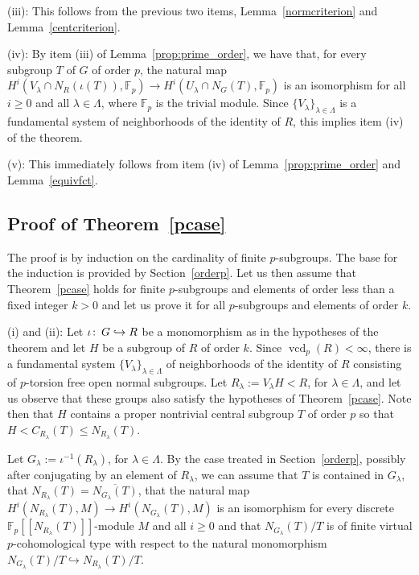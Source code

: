\documentclass[12pt,twoside]{amsart}
\newcommand\F{{\mathbb F}}
\newcommand\hookra{\hookrightarrow}
\newcommand\ol{\overline}
\newcommand\ld{\lambda}
\newcommand\Ld{\Lambda}
\def\co{\colon\thinspace}
\newcommand\vcd{\operatorname{vcd}}
\theoremstyle{definition}
\begin{document}
\noindent
(iii): This follows from the previous two items, Lemma~\ref{normcriterion} and Lemma~\ref{centcriterion}.
\smallskip

\noindent
(iv): By item (iii) of Lemma~\ref{prop:prime_order}, we have that, for every subgroup $T$ of $G$ of order $p$, the natural map
$H^i (V_\ld\cap N_{R}(\iota(T)),\F_p)\to H^i(U_\ld\cap N_G(T),\F_p)$ is an isomorphism for all $i\geq 0$ and all $\ld\in\Ld$,
where $\F_p$ is the trivial module. Since $\{V_\ld\}_{\ld\in\Ld}$ is a fundamental system of neighborhoods of the identity of $R$,
this implies  item (iv) of the theorem. 
\smallskip

\noindent
(v): This immediately follows from item (iv) of Lemma~\ref{prop:prime_order} and Lemma~\ref{equivfct}.
	
	
\subsection{Proof of Theorem~\ref{pcase}}\label{pcaseproof}
The proof is by induction on the cardinality of finite $p$-subgroups. The base for the induction is provided by Section~\ref{orderp}.
Let us then assume that Theorem~\ref{pcase} holds for finite $p$-subgroups and elements of order less than a fixed integer $k>0$ 
and let us prove it for all $p$-subgroups and elements of order $k$. 
\smallskip

\noindent
(i) and (ii):
Let $\iota\co G\hookra R$ be a monomorphism as in the hypotheses of the theorem and let $H$ be a subgroup of $R$ of order $k$. 
Since $\vcd_p(R)<\infty$, there is a fundamental system $\{V_\ld\}_{\ld\in\Ld}$ of neighborhoods of the identity of $R$ consisting of 
$p$-torsion free open normal subgroups. Let $R_\ld:=V_\ld H<R$, for $\ld\in\Ld$, and let us observe that these groups also satisfy 
the hypotheses of Theorem~\ref{pcase}. Note then that $H$ contains a proper nontrivial central subgroup $T$ of order $p$ so that 
$H<C_{R_\ld}(T)\leq N_{R_\ld}(T)$.

Let $G_\ld:=\iota^{-1}(R_\ld)$, for $\ld\in\Ld$. By the case treated in Section~\ref{orderp}, possibly after conjugating by an element of $R_\ld$, 
we can assume that $T$ is contained in $G_\ld$, that $N_{R_\ld}(T)=\ol{N_{G_\ld}(T)}$, that the natural map 
$H^i(N_{R_\ld}(T),M)\to H^i(N_{G_\ld}(T),M)$ is an isomorphism for every discrete $\F_p[[N_{R_\ld}(T)]]$-module $M$ and all $i\geq 0$ 
and that $N_{G_\ld}(T)/T$ is of finite virtual $p$-cohomological type with respect to the natural monomorphism $N_{G_\ld}(T)/T\hookra N_{R_\ld}(T)/T$.
\end{document}
